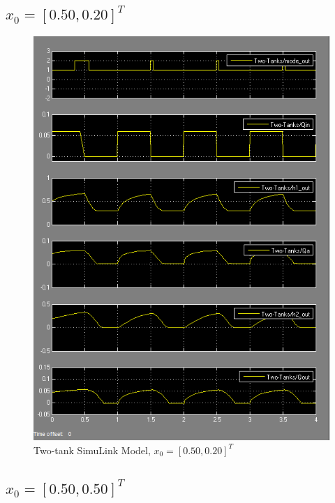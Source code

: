 \documentclass[letterpaper]{article}
\begin{document}
\subsection{$x_0 = [0.50, 0.20]^T$}

\begin{figure}[h!]
\centering
\includegraphics[scale=0.7]{hw8_50_20.png}
\caption{Two-tank SimuLink Model, $x_0 = [0.50, 0.20]^T$ }
\label{fig:two-tank-model-50-20}
\end{figure}

\subsection{$x_0 = [0.50, 0.50]^T$}
\end{document}
